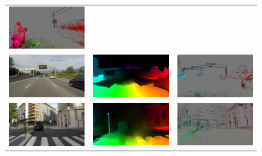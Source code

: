 \begin{figure}
\begin{tabular}{@{}ccc@{}}
    \includegraphics[width=0.325\linewidth]{mainmatter/figures/3_optical_flow/results_hd/motorcycle_overtaking_our_flow_gray.png} \\
    \includegraphics[width=0.325\linewidth]{mainmatter/figures/3_optical_flow/results_hd/highway_reference_cropped.png} &
    \includegraphics[width=0.325\linewidth]{mainmatter/figures/3_optical_flow/results_hd/highway_ground_truth_cropped.png} &
    \includegraphics[width=0.325\linewidth]{mainmatter/figures/3_optical_flow/results_hd/highway_our_flow_gray.png} \\
    \includegraphics[width=0.325\linewidth]{mainmatter/figures/3_optical_flow/results_hd/city_reference_cropped.png} &
    \includegraphics[width=0.325\linewidth]{mainmatter/figures/3_optical_flow/results_hd/city_ground_truth_cropped.png} &
    \includegraphics[width=0.325\linewidth]{mainmatter/figures/3_optical_flow/results_hd/city_our_flow_gray.png} \\

\end{tabular}
\end{figure}
